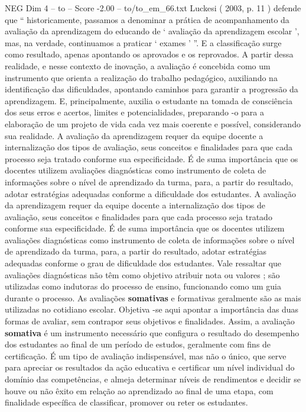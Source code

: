 \begin{textsample}{NEG Dim 4 – to – Score -2.00 – to/to\_em\_66.txt}
Luckesi ( 2003, p. 11 ) defende que “ historicamente, passamos a denominar a prática de acompanhamento da avaliação da aprendizagem do educando de ‘ avaliação da aprendizagem escolar ’, mas, na verdade, continuamos a praticar ‘ exames ’ ”.
E a classificação surge como resultado, apenas apontando os aprovados e os reprovados.
A partir dessa realidade, e nesse contexto de inovação, a avaliação é concebida como um instrumento que orienta a realização do trabalho pedagógico, auxiliando na identificação das dificuldades, apontando caminhos para garantir a progressão da aprendizagem.
E, principalmente, auxilia o estudante na tomada de consciência dos seus erros e acertos, limites e potencialidades, preparando -o para a elaboração de um projeto de vida cada vez mais coerente e possível, considerando sua realidade.
A avaliação da aprendizagem requer da equipe docente a internalização dos tipos de avaliação, seus conceitos e finalidades para que cada processo seja tratado conforme sua especificidade.
É de suma importância que os docentes utilizem avaliações diagnósticas como instrumento de coleta de informações sobre o nível de aprendizado da turma, para, a partir do resultado, adotar estratégias adequadas conforme a dificuldade dos estudantes.
A avaliação da aprendizagem requer da equipe docente a internalização dos tipos de avaliação, seus conceitos e finalidades para que cada processo seja tratado conforme sua especificidade.
É de suma importância que os docentes utilizem avaliações diagnósticas como instrumento de coleta de informações sobre o nível de aprendizado da turma, para, a partir do resultado, adotar estratégias adequadas conforme o grau de dificuldade dos estudantes.
Vale ressaltar que avaliações diagnósticas não têm como objetivo atribuir nota ou valores ; são utilizadas como indutoras do processo de ensino, funcionando como um guia durante o processo.
As avaliações \textbf{somativas} e formativas geralmente são as mais utilizadas no cotidiano escolar.
Objetiva -se aqui apontar a importância das duas formas de avaliar, sem contrapor seus objetivos e finalidades.
Assim, a avaliação \textbf{somativa} é um instrumento necessário que configura o resultado do desempenho dos estudantes ao final de um período de estudos, geralmente com fins de certificação.
É um tipo de avaliação indispensável, mas não o único, que serve para apreciar os resultados da ação educativa e certificar um nível individual do domínio das competências, e almeja determinar níveis de rendimentos e decidir se houve ou não êxito em relação ao aprendizado ao final de uma etapa, com finalidade específica de classificar, promover ou reter os estudantes.

\end{textsample}
